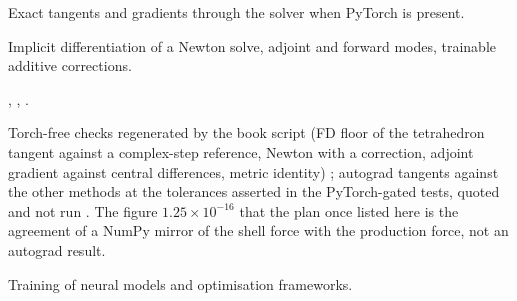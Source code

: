 \begin{description}[style=nextline,leftmargin=1em]
\item[Focus] Exact tangents and gradients through the solver when PyTorch is present.
\item[Mathematics] Implicit differentiation of a Newton solve, adjoint and forward modes, trainable additive corrections.
\item[Implementation] , , .
\item[Verification] Torch-free checks regenerated by the book script (FD floor of the tetrahedron tangent against a complex-step reference, Newton with a correction, adjoint gradient against central differences, metric identity) \have{}; autograd tangents against the other methods at the tolerances asserted in the PyTorch-gated tests, quoted and not run \have{}. The figure $1.25\times10^{-16}$ that the plan once listed here is the agreement of a NumPy mirror of the shell force with the production force, not an autograd result.
\item[Exclusions] Training of neural models and optimisation frameworks.
\end{description}
